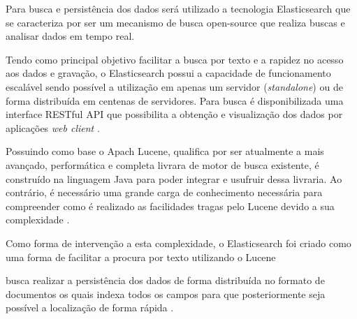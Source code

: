Para busca e persistência dos dados será utilizado a tecnologia Elasticsearch que se caracteriza por ser um mecanismo de busca open-source que realiza buscas e analisar dados em tempo real.

Tendo como principal objetivo facilitar a busca por texto e a rapidez no acesso aos dados e gravação, o Elasticsearch possui a capacidade de funcionamento escalável sendo possível a utilização em apenas um servidor (\textit{standalone}) ou de forma distribuída em centenas de servidores.  Para busca é disponibilizada uma interface RESTful API que possibilita a obtenção e visualização dos dados por aplicações \textit{web client} \cite{Gormley:2015}.

Possuindo como base o Apach Lucene, qualifica por ser atualmente a mais avançado, performática e completa livrara de motor de busca existente, é construído na linguagem Java para poder integrar e usufruir dessa livraria. Ao contrário, é necessário uma grande carga de conhecimento necessária para compreender como é realizado as facilidades tragas pelo Lucene devido a sua complexidade \cite{Gormley:2015}.

Como forma de intervenção a esta complexidade, o Elasticsearch foi criado como uma forma de facilitar a procura por texto utilizando o Lucene 

busca realizar a persistência dos dados de forma distribuída no formato de documentos os quais indexa todos os campos para que posteriormente seja possível a localização de forma rápida \cite{Gormley:2015}. 
